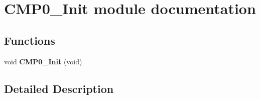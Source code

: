 \hypertarget{group___c_m_p0___init__module}{}\section{C\+M\+P0\+\_\+\+Init module documentation}
\label{group___c_m_p0___init__module}
\subsection*{Functions}
\begin{DoxyCompactItemize}
\item 
void {\bfseries C\+M\+P0\+\_\+\+Init} (void)\hypertarget{group___c_m_p0___init__module_gaeb01993864d0ffb7416b91384d68a047}{}\label{group___c_m_p0___init__module_gaeb01993864d0ffb7416b91384d68a047}

\end{DoxyCompactItemize}


\subsection{Detailed Description}
